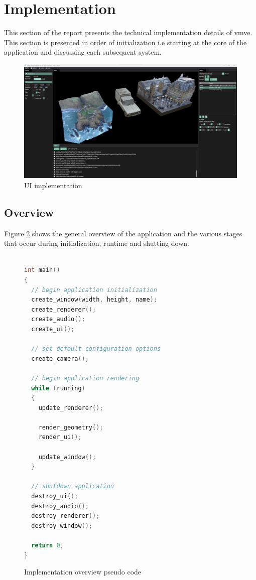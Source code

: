 \documentclass[11pt]{article}
\begin{document}
\clearpage
\section{Implementation}
This section of the report presents the technical implementation details of
\gls*{vmve}. This section is presented in order of initialization i.e starting at
the core of the application and discussing each subsequent system.

\begin{figure}[H]
  \centering
  \includegraphics[width=\textwidth]{images/ui_implementation.png}
  \caption{UI implementation}
  \label{fig:user_interface}
\end{figure}



\subsection{Overview}
Figure \ref{fig:overview_pseudo_code} shows the general overview of the application and the various 
stages that occur during initialization, runtime and shutting down.


\begin{figure}[ht]
\centering
\begin{lstlisting}[language=C++]

int main()
{
  // begin application initialization
  create_window(width, height, name);
  create_renderer();
  create_audio();
  create_ui();

  // set default configuration options
  create_camera();
  
  // begin application rendering
  while (running)
  {
    update_renderer();

    render_geometry();
    render_ui();

    update_window();
  }

  // shutdown application
  destroy_ui();
  destroy_audio();
  destroy_renderer();
  destroy_window();

  return 0;
}
\end{lstlisting}
\caption{Implementation overview pseudo code}
\label{fig:overview_pseudo_code}
\end{figure}
\end{document}
